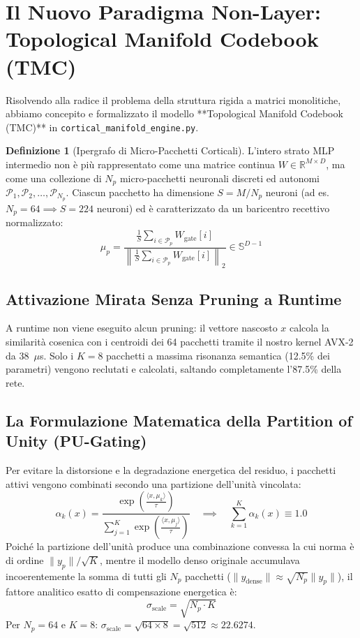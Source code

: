 \documentclass[10pt,a4paper]{article}
\theoremstyle{definition}
\newtheorem{definition}{Definizione}
\begin{document}
\bigskip

\section{Il Nuovo Paradigma Non-Layer: Topological Manifold Codebook (TMC)}

Risolvendo alla radice il problema della struttura rigida a matrici monolitiche, abbiamo concepito e formalizzato il modello **Topological Manifold Codebook (TMC)** in \texttt{cortical\_manifold\_engine.py}.

\begin{definition}[Ipergrafo di Micro-Pacchetti Corticali]
L'intero strato MLP intermedio non è più rappresentato come una matrice continua $W \in \mathbb{R}^{M \times D}$, ma come una collezione di $N_p$ micro-pacchetti neuronali discreti ed autonomi $\mathcal{P}_1, \mathcal{P}_2, \dots, \mathcal{P}_{N_p}$.
Ciascun pacchetto ha dimensione $S = M / N_p$ neuroni (ad es. $N_p = 64 \implies S = 224$ neuroni) ed è caratterizzato da un baricentro recettivo normalizzato:
\begin{equation}
\mu_p = \frac{\frac{1}{S} \sum_{i \in \mathcal{P}_p} W_{\text{gate}}[i]}{\left\| \frac{1}{S} \sum_{i \in \mathcal{P}_p} W_{\text{gate}}[i] \right\|_2} \in \mathbb{S}^{D-1}
\end{equation}
\end{definition}

\subsection{Attivazione Mirata Senza Pruning a Runtime}
A runtime non viene eseguito alcun pruning: il vettore nascosto $x$ calcola la similarità cosenica con i centroidi dei 64 pacchetti tramite il nostro kernel AVX-2 da 38~$\mu$s. Solo i $K=8$ pacchetti a massima risonanza semantica (12.5\% dei parametri) vengono reclutati e calcolati, saltando completamente l'87.5\% della rete.

\subsection{La Formulazione Matematica della Partition of Unity (PU-Gating)}
Per evitare la distorsione e la degradazione energetica del residuo, i pacchetti attivi vengono combinati secondo una partizione dell'unità vincolata:
\begin{equation}
\alpha_k(x) = \frac{\exp\left( \frac{\langle x, \mu_k \rangle}{\tau} \right)}{\sum_{j=1}^K \exp\left( \frac{\langle x, \mu_j \rangle}{\tau} \right)} \quad \implies \quad \sum_{k=1}^K \alpha_k(x) \equiv 1.0
\end{equation}
Poiché la partizione dell'unità produce una combinazione convessa la cui norma è di ordine $\|y_p\| / \sqrt{K}$, mentre il modello denso originale accumulava incoerentemente la somma di tutti gli $N_p$ pacchetti ($\|y_{\text{dense}}\| \approx \sqrt{N_p} \|y_p\|$), il fattore analitico esatto di compensazione energetica è:
\begin{equation}
\sigma_{\text{scale}} = \sqrt{N_p \cdot K}
\end{equation}
Per $N_p = 64$ e $K = 8$: $\sigma_{\text{scale}} = \sqrt{64 \times 8} = \sqrt{512} \approx 22.6274$.
\end{document}
